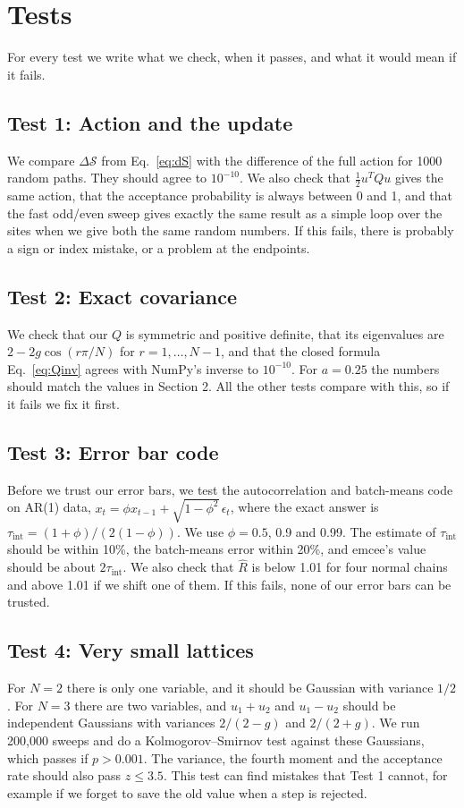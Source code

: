 \documentclass[11pt]{article}
\begin{document}
\section{Tests}
For every test we write what we check, when it passes, and what it would mean if it fails.

\subsection*{Test 1: Action and the update}
We compare $\Delta\mathcal S$ from Eq.~\eqref{eq:dS} with the difference of the full action for 1000 random paths. They should agree to $10^{-10}$. We also check that $\frac12 u^T Q u$ gives the same action, that the acceptance probability is always between 0 and 1, and that the fast odd/even sweep gives exactly the same result as a simple loop over the sites when we give both the same random numbers. If this fails, there is probably a sign or index mistake, or a problem at the endpoints.

\subsection*{Test 2: Exact covariance}
We check that our $Q$ is symmetric and positive definite, that its eigenvalues are $2 - 2g\cos(r\pi/N)$ for $r = 1, \dots, N-1$, and that the closed formula Eq.~\eqref{eq:Qinv} agrees with NumPy's inverse to $10^{-10}$. For $a = 0.25$ the numbers should match the values in Section 2. All the other tests compare with this, so if it fails we fix it first.

\subsection*{Test 3: Error bar code}
Before we trust our error bars, we test the autocorrelation and batch-means code on AR(1) data, $x_t = \phi x_{t-1} + \sqrt{1-\phi^2}\,\epsilon_t$, where the exact answer is $\tau_{\text{int}} = (1+\phi)/(2(1-\phi))$. We use $\phi = 0.5$, 0.9 and 0.99. The estimate of $\tau_{\text{int}}$ should be within 10\%, the batch-means error within 20\%, and emcee's value should be about $2\tau_{\text{int}}$. We also check that $\hat R$ is below 1.01 for four normal chains and above 1.01 if we shift one of them. If this fails, none of our error bars can be trusted.

\subsection*{Test 4: Very small lattices}
For $N = 2$ there is only one variable, and it should be Gaussian with variance $1/2$. For $N = 3$ there are two variables, and $u_1+u_2$ and $u_1-u_2$ should be independent Gaussians with variances $2/(2-g)$ and $2/(2+g)$. We run 200,000 sweeps and do a Kolmogorov--Smirnov test against these Gaussians, which passes if $p > 0.001$. The variance, the fourth moment and the acceptance rate should also pass $z \le 3.5$. This test can find mistakes that Test 1 cannot, for example if we forget to save the old value when a step is rejected.
\end{document}
